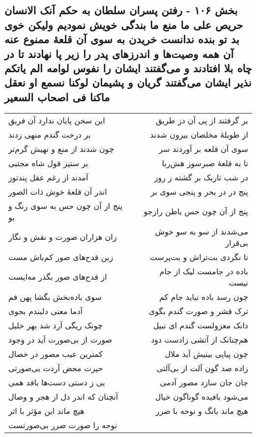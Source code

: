 \begin{center}
\section*{بخش ۱۰۶ - رفتن پسران سلطان به حکم آنک الانسان حریص علی ما منع  ما بندگی خویش نمودیم ولیکن  خوی بد تو بنده ندانست خریدن  به سوی آن قلعهٔ ممنوع عنه آن همه وصیت‌ها و اندرزهای پدر را زیر پا  نهادند تا در چاه بلا افتادند و می‌گفتند ایشان را نفوس لوامه الم یاتکم  نذیر ایشان می‌گفتند گریان و پشیمان لوکنا نسمع او نعقل ماکنا فی اصحاب السعیر}
\label{sec:sh106}
\begin{longtable}{l p{0.5cm} r}
این سخن پایان ندارد آن فریق
&&
بر گرفتند از پی آن دز طریق
\\
بر درخت گندم منهی زدند
&&
از طویلهٔ مخلصان بیرون شدند
\\
چون شدند از منع و نهیش گرم‌تر
&&
سوی آن قلعه بر آوردند سر
\\
بر ستیز قول شاه مجتبی
&&
تا به قلعهٔ صبرسوز هش‌ربا
\\
آمدند از رغم عقل پندتوز
&&
در شب تاریک بر گشته ز روز
\\
اندر آن قلعهٔ خوش ذات الصور
&&
پنج در در بحر و پنجی سوی بر
\\
پنج از آن چون حس به سوی رنگ و بو
&&
پنج از آن چون حس باطن رازجو
\\
زان هزاران صورت و نقش و نگار
&&
می‌شدند از سو به سو خوش بی‌قرار
\\
زین قدح‌های صور کم‌باش مست
&&
تا نگردی بت‌تراش و بت‌پرست
\\
از قدح‌های صور بگذر مه‌ایست
&&
باده در جامست لیک از جام نیست
\\
سوی باده‌بخش بگشا پهن فم
&&
چون رسد باده نیاید جام کم
\\
آدما معنی دلبندم بجوی
&&
ترک قشر و صورت گندم بگوی
\\
چونک ریگی آرد شد بهر خلیل
&&
دانک معزولست گندم ای نبیل
\\
صورت از بی‌صورت آید در وجود
&&
هم‌چنانک از آتشی زادست دود
\\
کمترین عیب مصور در خصال
&&
چون پیاپی بینیش آید ملال
\\
حیرت محض آردت بی‌صورتی
&&
زاده صد گون آلت از بی‌آلتی
\\
بی ز دستی دست‌ها بافد همی
&&
جان جان سازد مصور آدمی
\\
آنچنان که اندر دل از هجر و وصال
&&
می‌شود بافیده گوناگون خیال
\\
هیچ ماند این مؤثر با اثر
&&
هیچ ماند بانگ و نوحه با ضرر
\\
نوحه را صورت ضرر بی‌صورتست

\end{longtable}
\end{center}
